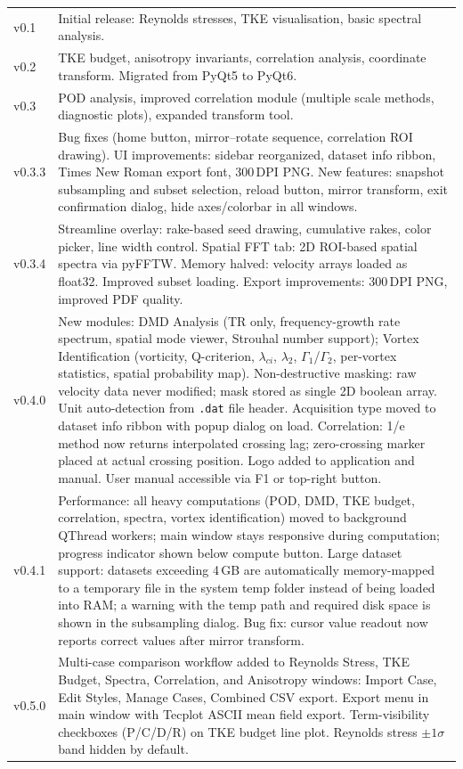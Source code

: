 \documentclass[11pt, a4paper]{report}
\begin{document}
\begin{longtable}{lp{12cm}}
\bottomrule
\endlastfoot
v0.1   & Initial release: Reynolds stresses, TKE visualisation, basic spectral analysis. \\
v0.2   & TKE budget, anisotropy invariants, correlation analysis, coordinate transform. Migrated from PyQt5 to PyQt6. \\
v0.3   & POD analysis, improved correlation module (multiple scale methods, diagnostic plots), expanded transform tool. \\
v0.3.3 & Bug fixes (home button, mirror--rotate sequence, correlation ROI drawing). UI improvements: sidebar reorganized, dataset info ribbon, Times New Roman export font, 300\,DPI PNG. New features: snapshot subsampling and subset selection, reload button, mirror transform, exit confirmation dialog, hide axes/colorbar in all windows. \\
v0.3.4 & Streamline overlay: rake-based seed drawing, cumulative rakes, color picker, line width control. Spatial FFT tab: 2D ROI-based spatial spectra via pyFFTW. Memory halved: velocity arrays loaded as float32. Improved subset loading. Export improvements: 300\,DPI PNG, improved PDF quality. \\
v0.4.0 & New modules: DMD Analysis (TR only, frequency-growth rate spectrum, spatial mode viewer, Strouhal number support); Vortex Identification (vorticity, Q-criterion, $\lambda_{ci}$, $\lambda_2$, $\Gamma_1$/$\Gamma_2$, per-vortex statistics, spatial probability map). Non-destructive masking: raw velocity data never modified; mask stored as single 2D boolean array. Unit auto-detection from \texttt{.dat} file header. Acquisition type moved to dataset info ribbon with popup dialog on load. Correlation: 1/e method now returns interpolated crossing lag; zero-crossing marker placed at actual crossing position. Logo added to application and manual. User manual accessible via F1 or top-right button. \\
v0.4.1 & Performance: all heavy computations (POD, DMD, TKE budget, correlation, spectra, vortex identification) moved to background QThread workers; main window stays responsive during computation; progress indicator shown below compute button. Large dataset support: datasets exceeding 4\,GB are automatically memory-mapped to a temporary file in the system temp folder instead of being loaded into RAM; a warning with the temp path and required disk space is shown in the subsampling dialog. Bug fix: cursor value readout now reports correct values after mirror transform. \\
v0.5.0 & Multi-case comparison workflow added to Reynolds Stress, TKE Budget, Spectra, Correlation, and Anisotropy windows: Import Case, Edit Styles, Manage Cases, Combined CSV export. Export menu in main window with Tecplot ASCII mean field export. Term-visibility checkboxes (P/C/D/R) on TKE budget line plot. Reynolds stress $\pm 1\sigma$ band hidden by default. \\

\end{longtable}
\end{document}
